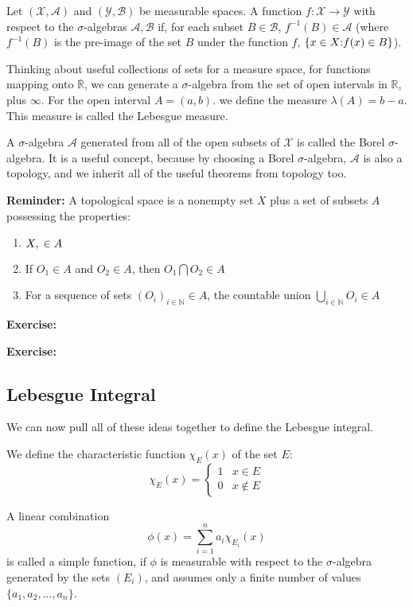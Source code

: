 \documentclass{article}
\begin{document}
Let $\left(\mathcal{X}, \mathcal{A}\right)$ and $\left(\mathcal{Y}, \mathcal{B}\right)$
be measurable spaces. A function $f:\mathcal{X} \rightarrow \mathcal{Y}$ with respect to the 
$\sigma$-algebras $\mathcal{A}, \mathcal{B}$ if, for each subset $B \in \mathcal{B}$, 
$f^{-1}(B) \in \mathcal{A}$ (where $f^{-1}(B)$ is the pre-image of the set $B$ under the 
function $f$, $\{x \in X \text: f(x) \in B\}$).

Thinking about useful collections of sets for a measure space, for functions mapping onto 
$\overline{\mathbb{R}}$, we can generate a $\sigma$-algebra from the set of open intervals
in $\mathbb{R}$, plus $\infty$.
For the open interval $A=(a,b)$. we define the measure $\lambda (A) = b-a$. This measure
is called the Lebesgue measure.

A $\sigma$-algebra $\mathcal{A}$ generated from all of the open subsets of $\mathcal{X}$
is called the Borel $\sigma$-algebra. It is a useful concept, because by choosing a Borel
$\sigma$-algebra, $\mathcal{A}$ is also a topology, and we inherit all of the useful
theorems from topology too.

\textbf{Reminder:} A topological space is a nonempty set $X$ plus a set of subsets $A$ possessing
the properties:

\begin{enumerate}
\item $X, \null \in A$
\item If $O_1 \in A$ and $O_2 \in A$, then $O_1 \bigcap O_2 \in A$
\item For a sequence of sets $\left(O_i\right)_{i\in \mathbb{N}} \in A$, the countable
	union $\bigcup_{i\in \mathbb{N}} O_i \in A$
\end{enumerate}

\textbf{Exercise:}

\textbf{Exercise:}

\subsection{Lebesgue Integral}

We can now pull all of these ideas together to define the Lebesgue integral.

We define the characteristic function $\chi_E(x)$ of
the set $E$:
\[ \chi_E(x)=\left\{ 
\begin{array}{ll}
1 & x \in E\\
0 & x \notin E
\end{array} \right.
\]

A linear combination
\[ \phi(x) = \sum_{i=1}^{n}a_i\chi_{E_i}(x) \]
is called a simple function, if $\phi$ is measurable with respect to the $\sigma$-algebra
generated by the sets $(E_i)$, and assumes only a finite number of values
$\{a_1,a_2,...,a_n\}$. 
\end{document}
